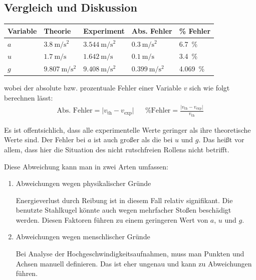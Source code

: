 \documentclass[twoside]{article}
\makeatletter
\newcommand{\resnum}[0]{\let\@seccntformat\@oldseccntformat}
\makeatother
\begin{document}
    \subsection{Vergleich und Diskussion}
        \begin{center}
            \begin{tabular}{lllll}
                \toprule
                Variable & Theorie & Experiment & Abs. Fehler & \% Fehler \\
                \midrule
                $a$ & $\SI{3.8}{\meter\per\second\squared}$ & $\SI{3,544}{\meter\per\second\squared}$ & $\SI{0.3}{\meter\per\second\squared}$ & \SI{6.7}{\percent}\\
                $u$ & $\SI{1.7}{\meter\per\second}$ & $\SI{1.642}{\meter\per\second}$ & $\SI{0.1}{\meter\per\second}$ & \SI{3.4}{\percent} \\
                $g$ & $\SI{9.807}{\meter\per\second\squared}$ & $\SI{9.408}{\meter\per\second\squared}$ & $\SI{0.399}{\meter\per\second\squared}$ & \SI{4.069}{\percent} \\
                \bottomrule
            \end{tabular}
        \end{center}
        wobei der absolute bzw. prozentuale Fehler einer Variable $v$ sich wie folgt berechnen lässt:
        \begin{align}
            \text{Abs. Fehler} = \lvert v_{\text{th}} - v_{\text{exp}} \rvert && \text{\% Fehler} = \frac{\lvert v_{\text{th}} - v_{\text{exp}}\rvert}{v_\text{th}} 
        \end{align}

        Es ist offentsichlich, dass alle experimentelle Werte geringer als ihre theoretische Werte sind. Der Fehler bei $a$ ist auch großer als die bei $u$ und $g$. Das heißt vor allem, dass hier die Situation des nicht rutschfreien Rollens nicht betrifft. 

        Diese Abweichung kann man in zwei Arten umfassen:
        \begin{enumerate}
            \item Abweichungen wegen physikalischer Gründe

                Energieverlust durch Reibung ist in diesem Fall relativ signifikant. Die benutzte Stahlkugel könnte auch wegen mehrfacher Stoßen beschädigt werden. Diesen Faktoren führen zu einem geringeren Wert von $a$, $u$ und $g$.

            \item Abweichungen wegen menschlischer Gründe

                Bei Analyse der Hochgeschwindigkeitsaufnahmen, muss man Punkten und Achsen manuell definieren. Das ist eher ungenau und kann zu Abweichungen führen. 
        \end{enumerate}
\end{document}
